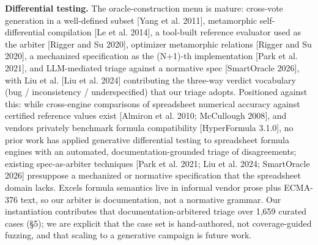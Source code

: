 \documentclass[
]{article}
\begin{document}
\textbf{Differential testing.} The oracle-construction menu is mature:
cross-vote generation in a well-defined subset {[}Yang et al. 2011{]},
metamorphic self-differential compilation {[}Le et al. 2014{]}, a
tool-built reference evaluator used as the arbiter {[}Rigger and Su
2020{]}, optimizer metamorphic relations {[}Rigger and Su 2020{]}, a
mechanized specification as the (N+1)-th implementation {[}Park et al.
2021{]}, and LLM-mediated triage against a normative spec {[}SmartOracle
2026{]}, with Liu et al. {[}Liu et al. 2024{]} contributing the
three-way verdict vocabulary (bug / inconsistency / underspecified) that
our triage adopts. Positioned against this: while cross-engine
comparisons of spreadsheet numerical accuracy against certified
reference values exist {[}Almiron et al. 2010; McCullough 2008{]}, and
vendors privately benchmark formula compatibility {[}HyperFormula
3.1.0{]}, no prior work has applied generative differential testing to
spreadsheet formula engines with an automated, documentation-grounded
triage of disagreements; existing spec-as-arbiter techniques {[}Park et
al. 2021; Liu et al. 2024; SmartOracle 2026{]} presuppose a mechanized
or normative specification that the spreadsheet domain lacks.
Excel\textquotesingle s formula semantics live in informal vendor prose
plus ECMA-376 text, so our arbiter is documentation, not a normative
grammar. Our instantiation contributes that documentation-arbitered
triage over 1,659 curated cases (§5); we are explicit that the case set
is hand-authored, not coverage-guided fuzzing, and that scaling to a
generative campaign is future work.
\end{document}
